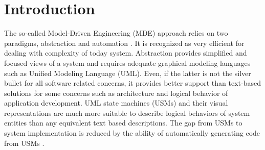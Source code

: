 

\section{Introduction}
\label{sec:introduction}
The so-called Model-Driven Engineering (MDE) approach relies on two paradigms, abstraction and automation \cite{Mussbacher2014}. It is recognized as very efficient for dealing with complexity of today system. 
Abstraction provides simplified and focused views of a system and requires adequate graphical modeling languages such as Unified Modeling Language (UML). Even, if the latter is not the silver bullet for all software related concerns, it provides better support than text-based solutions for some concerns such as architecture and logical behavior of application development. UML state machines (USMs) and their visual representations are much more suitable to describe logical behaviors of system entities than any equivalent text based descriptions. The gap from USMs to system implementation is reduced by the ability of automatically generating code from USMs  \cite{Booch1998, Douglass1999,Shalyto2006,Douglass1999}. 

